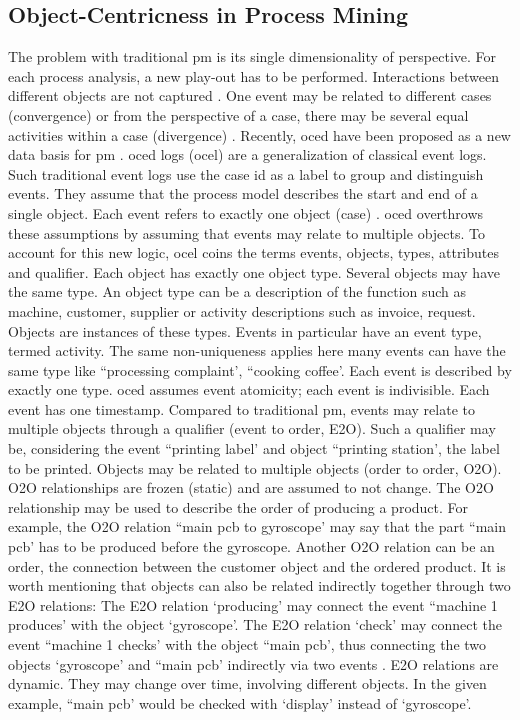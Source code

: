 \subsection{Object-Centricness in Process Mining}
\label{sec:object-centric-event-logs}

The problem with traditional \gls{pm} is its single dimensionality of perspective. For each process analysis, a new play-out has to be performed. Interactions between different objects are not captured \autocite{van2023object}. One event may be related to different cases (convergence) or from the perspective of a case, there may be several equal activities within a case (divergence) \autocite{van2019object}.
Recently, \gls{oced} have been proposed as a new data basis for \gls{pm} \autocite{van2019object}. \gls{oced} logs (\gls{ocel}) are a generalization of classical event logs. Such traditional event logs use the case \gls{id} as a label to group and distinguish events. They assume that the process model describes the start and end of a single object. Each event refers to exactly one object (case) \autocite{van2023object}. \gls{oced} overthrows these assumptions by assuming that events may relate to multiple objects. To account for this new logic, \gls{ocel} coins the terms events, objects, types, attributes and qualifier. Each object has exactly one object type. Several objects may have the same type. An object type can be a description of the function such as machine, customer, supplier or activity descriptions such as invoice, request. Objects are instances of these types. Events in particular have an event type, termed activity. The same non-uniqueness applies here \textemdash many events can have the same type like ``processing complaint', ``cooking coffee'. Each event is described by exactly one type. \gls{oced} assumes event atomicity; each event is indivisible. Each event has one timestamp. Compared to traditional \gls{pm}, events may relate to multiple objects through a qualifier (event to order, E2O). Such a qualifier may be, considering the event ``printing label' and object ``printing station', the label to be printed. Objects may be related to multiple objects (order to order, O2O). O2O relationships are frozen (static) and are assumed to not change. The O2O relationship may be used to describe the order of producing a product. For example, the O2O relation ``main pcb to gyroscope' may say that the part ``main pcb' has to be produced before the gyroscope. Another O2O relation can be an order, the connection between the customer object and the ordered product. It is worth mentioning that objects can also be related indirectly together through two E2O relations: The E2O relation `producing' may connect the event ``machine 1 produces' with the object `gyroscope'. The E2O relation `check' may connect the event ``machine 1 checks' with the object ``main pcb', thus connecting the two objects `gyroscope' and ``main pcb' indirectly via two events \autocite{van2019object}. E2O relations are dynamic. They may change over time, involving different objects. In the given example, ``main pcb' would be checked with `display' instead of `gyroscope'.

